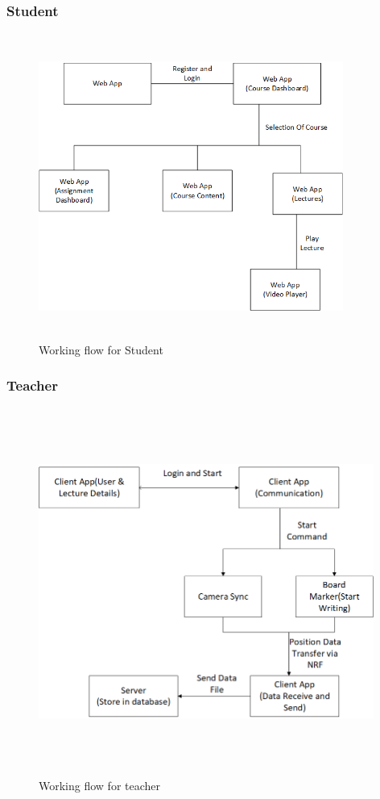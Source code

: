 \documentclass[12pt]{article}
\begin{document}
\subsubsection{Student}
\begin{figure}[h]
  \centering
  \includegraphics[width=10cm, height=10cm]{StudentFlowDiagram}
  \caption{Working flow for Student}
\end{figure}

\newpage
\subsubsection{Teacher}
\begin{figure}[h]
  \centering
  \includegraphics[width=11cm, height=12cm]{TeacherFlowDiagram}
  \caption{Working flow for teacher}
\end{figure}
\end{document}
